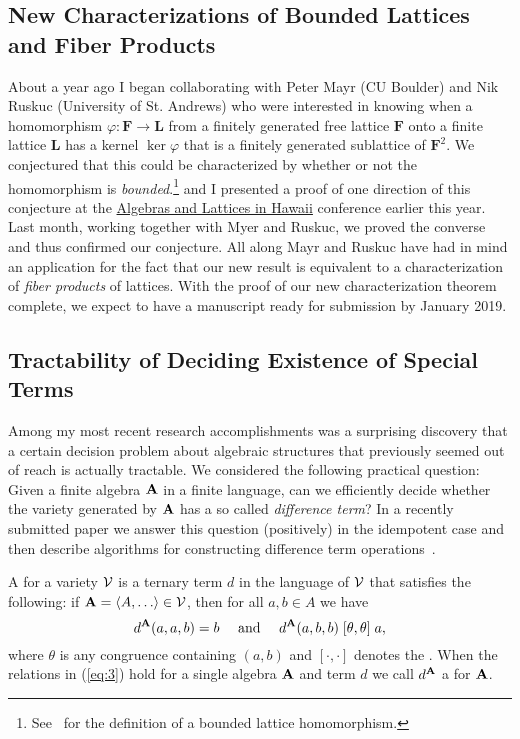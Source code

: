\subsection{New Characterizations of Bounded Lattices and Fiber Products}
\label{sec:fiber}
About a year ago I began collaborating with Peter Mayr (CU Boulder) and Nik Ruskuc (University of St. Andrews) who were interested in knowing when a homomorphism $\varphi \colon \mathbf{F} \to \mathbf{L}$ from a finitely generated free lattice $\mathbf{F}$ onto a finite lattice $\mathbf L$ has a kernel $\ker \varphi$ that is a finitely generated sublattice of $\mathbf{F}^2$.  We conjectured that this could be characterized by whether or not the homomorphism is \emph{bounded}.\footnote{See~\cite{MR1319815} for the definition of a bounded lattice homomorphism.} and I presented a proof of one direction of this conjecture at the \href{https://universalalgebra.github.io/ALH-2018/}{Algebras and Lattices in Hawaii} conference earlier this year. Last month, working together with Myer and Ruskuc, we proved the converse and thus confirmed our conjecture.  All along Mayr and Ruskuc have had in mind an application for the fact that our new result is equivalent to a characterization of \emph{fiber products} of lattices.  With the proof of our new characterization theorem complete, we expect to have a manuscript ready for submission by January 2019.  


\subsection{Tractability of Deciding Existence of Special Terms}
\label{sec:diffterm}
Among my most recent research accomplishments was a surprising discovery that a certain decision problem about algebraic structures that previously seemed out of reach is actually tractable. 
We considered the following practical question: Given a finite
algebra $\mathbf{A}$ in a finite language, can we efficiently decide whether the variety generated by $\mathbf{A}$ has a so called \emph{difference term}?  In a recently submitted paper we answer this question (positively) in the idempotent case and then describe algorithms for constructing difference term operations~\cite{DFV:2018}.
 
A  for a variety $\mathcal{V}$ is a ternary term $d$ in the language of $\mathcal{V}$ that satisfies the following:  if $\alg{A} = \<A, \dots \> \in \sV$, then for all $a, b \in A$ we have
  \begin{equation}
  \label{eq:3}
  d^{\mathbf{A}}(a,a,b) = b \quad \text{ and } \quad
  d^{\mathbf{A}}(a,b,b) \mathrel{[\theta, \theta]} a,
  \end{equation}
  where $\theta$ is any congruence %
  containing $(a,b)$
  and $[\cdot, \cdot]$ denotes the .
  When the relations in (\ref{eq:3}) hold for a single algebra $\mathbf{A}$ and term $d$ we call $d^{\mathbf{A}}$
  a  for $\mathbf{A}$.
  
